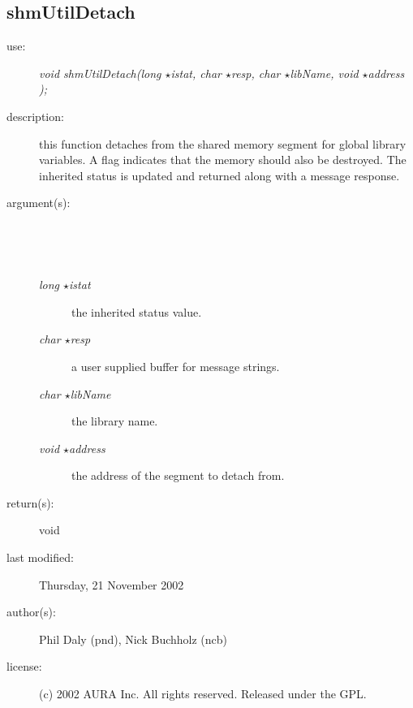 \subsection {shmUtilDetach} \begin{description} \item[\sc use:] \emph{void shmUtilDetach(long $\star$istat, char $\star$resp, char $\star$libName, void $\star$address );} \item[\sc description:] this function detaches from the shared memory segment for global library variables. A flag indicates that the memory should also be destroyed. The inherited status is updated and returned along with a message response. \item[\sc argument(s):] \begin{description} \item[\ ] \ \item[\emph{long $\star$istat}] the inherited status value. \item[\emph{char $\star$resp}] a user supplied buffer for message strings. \item[\emph{char $\star$libName}] the library name. \item[\emph{void $\star$address}] the address of the segment to detach from. \end{description} \item[\sc return(s):] void \item[\sc last modified:] Thursday, 21 November 2002 \item[\sc author(s):] Phil Daly (pnd), Nick Buchholz (ncb) \item[\sc license:] (c) 2002 AURA Inc. All rights reserved. Released under the GPL. \end{description}
